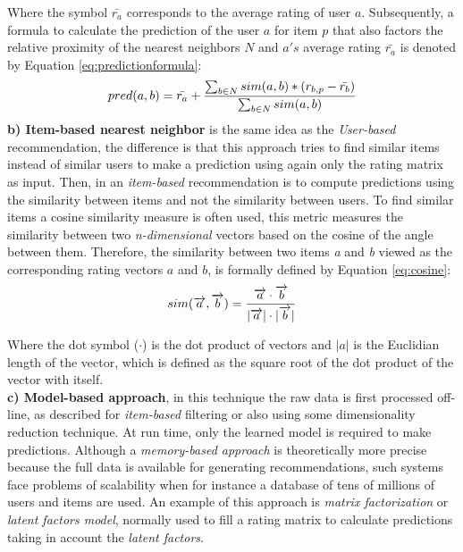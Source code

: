 Where the symbol $\bar{r_a}$ corresponds to the average rating of user
$a$. Subsequently, a formula to calculate the prediction of the user
$a$ for item $p$ that also factors the relative proximity of the
nearest neighbors $N$ and $a's$ average rating $\bar{r_a}$ is denoted
by Equation \ref{eq:predictionformula}:
\begin{equation}\label{eq:predictionformula}
\displaystyle pred(a,b) = \bar{r_a} + 
{\sum_{b \in N} sim(a,b) * (r_{b,p}- \bar{r_b}) 
\over \sum_{b \in N} sim(a,b)} 
\end{equation}
\textbf{b) Item-based nearest neighbor} is the same idea as the \textit
{User-based} recommendation, the difference is that this approach tries to find
similar items instead of similar users to make a prediction using again only the rating
matrix as input. Then, in an \textit{item-based} recommendation is to compute
predictions using the similarity between items and not the similarity
between users. To find similar items a cosine similarity measure is often used,
this metric measures the similarity between two
\textit{n-dimensional} vectors based on the cosine of the angle between them.
Therefore, the similarity between two items \textit{a} and \textit{b}
viewed as the corresponding rating vectors $a$ and $b$, is formally
defined by Equation \ref{eq:cosine}:
\begin{equation}\label{eq:cosine}
\displaystyle sim(\overrightarrow{a},\overrightarrow{b})= 
{\overrightarrow{a} \cdot \overrightarrow{b} \over
|\overrightarrow{a}| \cdot |\overrightarrow{b}| }
\end{equation}

Where the dot symbol ($\cdot$) is the dot product of vectors and $|a|$ 
is the Euclidian length of the vector, which is defined as the 
square root of the dot product of the vector with itself.\\
\textbf{c) Model-based approach}, in this technique the raw data is
first processed off-line, as described for \textit{item-based}
filtering or also using some dimensionality reduction technique. At run time,
only the learned model is required to make predictions. Although a
\textit{memory-based approach} is theoretically more precise because
the full data is available for generating recommendations, such systems
face problems of scalability when for instance a database of tens of 
millions of users and items are used. An example of this approach is
\textit{matrix factorization} or \textit{latent factors model},
normally used to fill a rating matrix to calculate predictions taking
in account the \textit{latent factors}.

